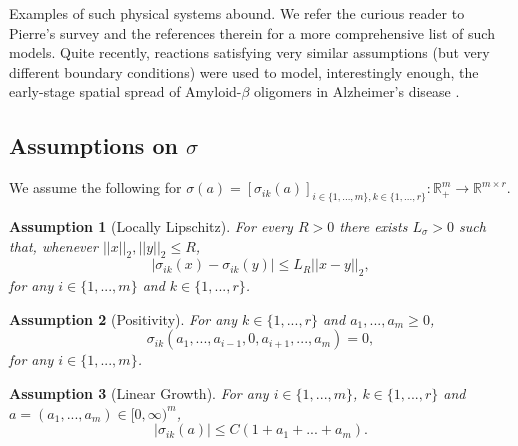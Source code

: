 \documentclass[12pt]{article}
\newtheorem{assumption}{Assumption}
\theoremstyle{definition}
\theoremstyle{remark}
\begin{document}
Examples of such physical systems abound. We refer the curious reader to Pierre's survey \cite{pierre2010global} and the references therein for a more comprehensive list of such models. Quite recently,  reactions satisfying very similar assumptions (but very different boundary conditions) were used to model, interestingly enough, the early-stage spatial spread of Amyloid-$\beta$ oligomers in Alzheimer's disease \cite{alzheimers}.
\subsection{Assumptions on $\sigma$}
We assume the following for $\sigma(a) = [\sigma_{ik}(a)]_{i\in \{1,...,m\},k\in \{1,...,r\}}: \mathbb R^{m}_{+}\rightarrow \mathbb R^{m\times r}$.
\begin{assumption}[Locally Lipschitz]\label{assump: Locally Lipschitz sigma} For every $R>0$ there exists $L_\sigma>0$ such that, whenever $||x||_2,||y||_2\leq R$,
\[
|\sigma_{ik}(x) - \sigma_{ik}(y)|\leq L_R ||x-y||_2,
\]
for any $i\in\{1,...,m\}$ and $k\in \{1,...,r\}$.
\end{assumption}
\begin{assumption}[Positivity]\label{assump: Positivity sigma} For any $k\in \{1,...,r\}$ and $a_1,...,a_m\geq 0$,
\[
\sigma_{ik}(a_1,...,a_{i-1},0,a_{i+1},...,a_m) = 0,
\]
for any $i\in \{1,...,m\}$.
\end{assumption}
\begin{assumption}[Linear Growth]\label{assump: Linear growth sigma} For any $i\in \{1,...,m\}$,  $k\in \{1,...,r\}$ and $a = (a_1,...,a_m)\in [0,\infty)^m$,
\[
|\sigma_{ik}(a)| \leq C(1+a_1+...+a_m).
\]
\end{assumption}
\end{document}
